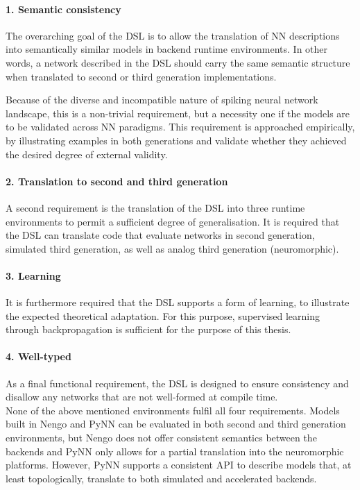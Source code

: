 \documentclass[report.tex]{subfiles}
\begin{document}
\paragraph{1. Semantic consistency}
The overarching goal of the \gls{DSL} is to allow the translation 
of \gls{NN} descriptions into semantically similar models in backend runtime
environments.
In other words, a network described in the \gls{DSL} should carry
the same semantic structure when translated to second or third generation
implementations. 

Because of the diverse and incompatible nature of spiking neural network
landscape, this is a non-trivial requirement,
but a necessity one if the models are to be validated across \gls{NN} paradigms.
This requirement is approached empirically, by illustrating examples in
both generations and validate whether they achieved the desired degree
of external validity.

\paragraph{2. Translation to second and third generation}
A second requirement is the translation of the \gls{DSL} into
three runtime environments to permit a sufficient degree of
generalisation.
It is required that the DSL can translate code that evaluate networks
in second generation, simulated third generation, as well as
analog third generation (neuromorphic).

\paragraph{3. Learning}
It is furthermore required that the \gls{DSL} supports a form of
learning, to illustrate the expected theoretical adaptation.
For this purpose, supervised learning through backpropagation
is sufficient for the purpose of this thesis.

\paragraph{4. Well-typed}
As a final functional requirement, the \gls{DSL} is designed to ensure
consistency and disallow any networks that are not well-formed at
compile time.
\\[0.4cm]
\noindent
None of the above mentioned environments fulfil all four requirements.
Models built in Nengo and PyNN can be evaluated
in both second and third generation environments, but Nengo does not 
offer consistent semantics between the backends and PyNN only allows
for a partial translation into the neuromorphic platforms.
However, PyNN supports a consistent \gls{API} to describe models that, at
least topologically, translate to both simulated and accelerated 
backends.
\end{document}
